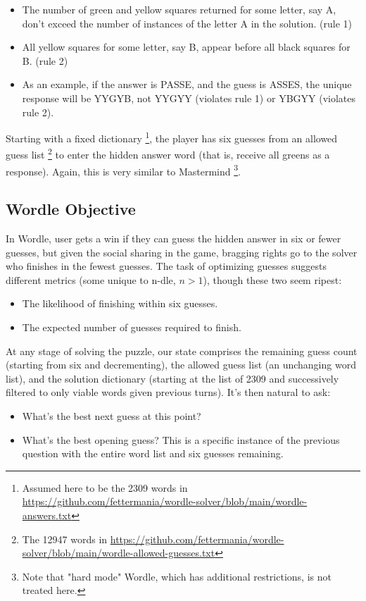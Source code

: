\documentclass[11pt, oneside]{article} 	%
\begin{document}
\begin{itemize}
\item The number of green and yellow squares returned for some letter, say A, don't exceed the number of instances of the letter A in the solution. (rule 1)
\item All yellow squares for some letter, say B, appear before all black squares for B. (rule 2) 
\item As an example, if the answer is PASSE, and the guess is ASSES, the unique response will be YYGYB, not YYGYY (violates rule 1) or YBGYY (violates rule 2).
\end{itemize}
 

Starting with a fixed dictionary \footnote{Assumed here to be the 2309 words in \url{https://github.com/fettermania/wordle-solver/blob/main/wordle-answers.txt}}, the player has six guesses from an allowed guess list \footnote{The 12947 words in \url{https://github.com/fettermania/wordle-solver/blob/main/wordle-allowed-guesses.txt}} to enter the hidden answer word (that is, receive all greens as a response). Again, this is very similar to Mastermind \footnote{Note that "hard mode" Wordle, which has additional restrictions, is not treated here.}.

\subsection{Wordle Objective}

In Wordle, user gets a win if they can guess the hidden answer in six or fewer guesses, but given the social sharing in the game, bragging rights go to the solver who finishes in the fewest guesses. The task of optimizing guesses suggests different metrics (some unique to n-dle, $n > 1$), though these two seem ripest:

\begin{itemize}
\item The likelihood of finishing within six guesses.
\item The expected number of guesses required to finish.
\end{itemize}

At any stage of solving the puzzle, our state comprises the remaining guess count (starting from six and decrementing), the allowed guess list (an unchanging word list), and the solution dictionary (starting at the list of 2309 and successively filtered to only viable words given previous turns). It's then natural to ask:

\begin{itemize}
\item What's the best next guess at this point?
\item What's the best opening guess? This is a specific instance of the previous question with the entire word list and six guesses remaining.
\end{itemize}
\end{document}
